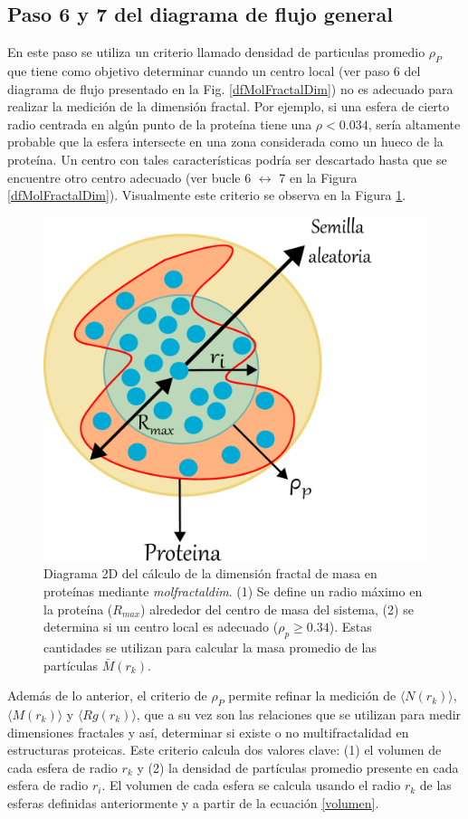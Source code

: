 	 
	 
	 \subsection{Paso 6 y 7 del diagrama de flujo general}
	 
	 En este paso se utiliza un criterio llamado densidad de particulas promedio \(\rho_{P}\) que tiene como objetivo determinar cuando un centro local (ver paso 6 del diagrama de flujo presentado en la Fig. \ref{dfMolFractalDim}) no es adecuado para realizar la medici\'{o}n de la dimensi\'{o}n fractal. Por ejemplo, si una esfera de cierto radio centrada en alg\'{u}n punto de la proteína tiene una $\rho < 0.034$, ser\'{i}a altamente probable que la esfera intersecte en una zona considerada como un hueco de la prote\'{i}na. Un centro con tales caracter\'{i}sticas podr\'{i}a ser descartado hasta que se encuentre otro centro adecuado (ver bucle 6 $\longleftrightarrow$ 7 en la Figura \ref{dfMolFractalDim}). Visualmente este criterio se observa en la Figura \ref{fig:centrob}. 
	 
	 	\begin{figure}[H]
	 	\centering
	 	\includegraphics[width=0.5\linewidth]{graphs/centrob4.pdf}
	 	\caption{Diagrama 2D del c\'{a}lculo de la dimensi\'{o}n fractal de masa en prote\'{i}nas mediante \textit{molfractaldim}. (1) Se define un radio m\'{a}ximo en la prote\'{i}na ($R_{max}$) alrededor del centro de masa del sistema, (2) se determina si un centro local es adecuado ($\rho_{p} \geq 0.34$). Estas cantidades se utilizan para calcular la masa promedio de las part\'{i}culas $\bar{M}(r_k)$.}
	 	\label{fig:centrob}
	 \end{figure}
	 
	  Además de lo anterior, el criterio de \(\rho_{P}\) permite refinar la medici\'{o}n de $\langle N(r_k) \rangle$, $\langle M(r_k) \rangle$ y $\langle Rg(r_k) \rangle$, que a su vez son las relaciones que se utilizan para medir dimensiones fractales y as\'{i}, determinar si existe o no multifractalidad en estructuras proteicas. Este criterio calcula dos valores clave: (1) el volumen de cada esfera de radio \(r_k\) y (2) la densidad de partículas promedio presente en cada esfera de radio \(r_i\). El volumen de cada esfera se calcula usando el radio \(r_k\) de las esferas definidas anteriormente y a partir de la ecuaci\'{o}n \ref{volumen}.\\
	 
